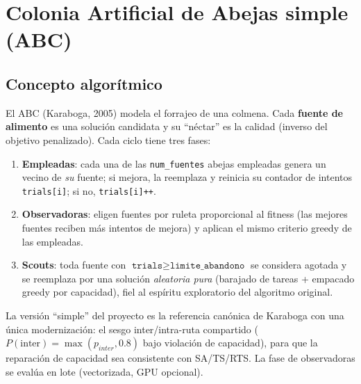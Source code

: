 \section{Colonia Artificial de Abejas simple (ABC)}
\label{sec:mh-abc}

\subsection{Concepto algorítmico}
El ABC (Karaboga, 2005) modela el forrajeo de una colmena. Cada
\textbf{fuente de alimento} es una solución candidata y su ``néctar'' es la
calidad (inverso del objetivo penalizado). Cada ciclo tiene tres fases:

\begin{enumerate}
  \item \textbf{Empleadas}: cada una de las \texttt{num\_fuentes} abejas
    empleadas genera un vecino de \emph{su} fuente; si mejora, la reemplaza y
    reinicia su contador de intentos \texttt{trials[i]}; si no,
    \texttt{trials[i]{+}{+}}.
  \item \textbf{Observadoras}: eligen fuentes por ruleta proporcional al
    fitness (las mejores fuentes reciben más intentos de mejora) y aplican el
    mismo criterio greedy de las empleadas.
  \item \textbf{Scouts}: toda fuente con $\texttt{trials} \ge
    \texttt{limite\_abandono}$ se considera agotada y se reemplaza por una
    solución \emph{aleatoria pura} (barajado de tareas + empacado greedy por
    capacidad), fiel al espíritu exploratorio del algoritmo original.
\end{enumerate}

La versión ``simple'' del proyecto es la referencia canónica de Karaboga con
una única modernización: el sesgo inter/intra-ruta compartido
($P(\text{inter}) = \max(p_{inter}, 0.8)$ bajo violación de capacidad), para
que la reparación de capacidad sea consistente con SA/TS/RTS. La fase de
observadoras se evalúa en lote (vectorizada, GPU opcional).

